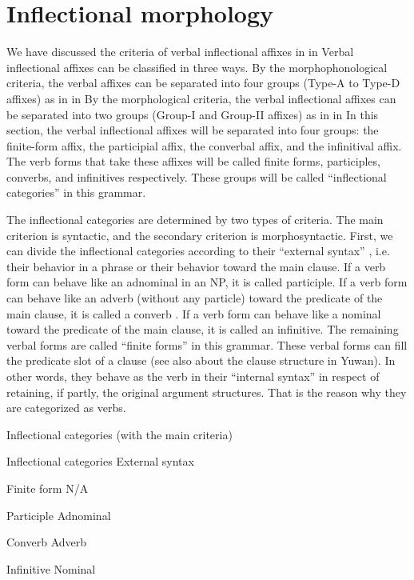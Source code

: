 \section{Inflectional morphology}

We have discussed the criteria of verbal inflectional affixes in  in  Verbal inflectional affixes can be classified in three ways. By the morphophonological criteria, the verbal affixes can be separated into four groups (Type-A to Type-D affixes) as in  in  By the morphological criteria, the verbal inflectional affixes can be separated into two groups (Group-I and Group-II affixes) as in  in  In this section, the verbal inflectional affixes will be separated into four groups: the finite-form affix, the participial affix, the converbal affix, and the infinitival affix. The verb forms that take these affixes will be called finite forms, participles, converbs, and infinitives respectively. These groups will be called “inflectional categories” in this grammar.

  The inflectional categories are determined by two types of criteria. The main criterion is syntactic, and the secondary criterion is morphosyntactic. First, we can divide the inflectional categories according to their “external syntax” \citep{Haspelmath1996}, i.e. their behavior in a phrase or their behavior toward the main clause. If a verb form can behave like an adnominal in an NP, it is called participle. If a verb form can behave like an adverb (without any particle) toward the predicate of the main clause, it is called a converb \citep{Haspelmath1995}. If a verb form can behave like a nominal toward the predicate of the main clause, it is called an infinitive. The remaining verbal forms are called “finite forms” in this grammar. These verbal forms can fill the predicate slot of a clause (see also  about the clause structure in Yuwan). In other words, they behave as the verb in their “internal syntax” \citep{Haspelmath1996} in respect of retaining, if partly, the original argument structures. That is the reason why they are categorized as verbs.

\begin{table}
\caption{\label{tab:key:77}Inflectional categories (with the main criteria)}

Inflectional categories  External syntax

Finite form  N/A

Participle  Adnominal

Converb  Adverb

Infinitive  Nominal
\end{table}


